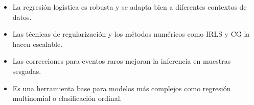 \documentclass[12pt]{article}
\begin{document}
\begin{itemize}
    \item La regresión logística es robusta y se adapta bien a diferentes contextos de datos.
    \item Las técnicas de regularización y los métodos numéricos como IRLS y CG la hacen escalable.
    \item Las correcciones para eventos raros mejoran la inferencia en muestras sesgadas.
    \item Es una herramienta base para modelos más complejos como regresión multinomial o clasificación ordinal.
\end{itemize}
\end{document}

